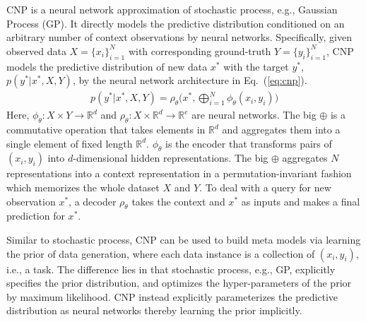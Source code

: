 CNP is a neural network approximation of stochastic process, e.g., Gaussian Process (GP). It directly models the predictive distribution conditioned on an arbitrary number of context observations by neural networks.
Specifically, given observed data $X = \{x_i\}_{i = 1}^N$ with corresponding ground-truth $Y = \{ y_i\}_{i = 1}^N$, CNP models the predictive distribution of new data $x^*$ with the target $y^*$, $p(y^*| x^*, X, Y)$, by the neural network architecture in Eq.~(\ref{eq:cnp}).
\begin{align}
	\label{eq:cnp}
	p(y^*| x^*, X, Y) = \rho_\theta \biggl(x^*,  \bigoplus_{i = 1}^{N} \phi_\theta(x_i,y_i) \biggr) 
\end{align}
Here, $\phi_\theta: X \times Y \rightarrow \mathbb{R}^d$ and $\rho_\theta: X \times \mathbb{R}^d \rightarrow \mathbb{R}^e$ are neural networks. The big $\oplus$ is a commutative operation that takes elements in $\mathbb{R}^d$ and aggregates them into a single element of fixed length $\mathbb{R}^d$. 
$\phi_\theta$ is the encoder that transforms pairs of $(x_i, y_i)$ into $d$-dimensional hidden representations. 
The big $\oplus$ aggregates $N$ representations into a context representation in a permutation-invariant fashion which memorizes the whole dataset $X$ and $Y$. 
To deal with a query for new observation $x^*$,  a decoder $\rho_\theta$ takes the context and $x^*$ as inputs and makes a final prediction for $x^*$. 
%

Similar to stochastic process, CNP can be used to build meta models via learning the prior of data generation, where each data instance is a collection of $(x_i, y_i)$, i.e., a task. 
The difference lies in that stochastic process, e.g., GP, explicitly specifies the prior distribution, and optimizes the hyper-parameters of the prior by maximum likelihood. CNP instead explicitly parameterizes the predictive distribution as neural networks thereby learning the prior implicitly. 


